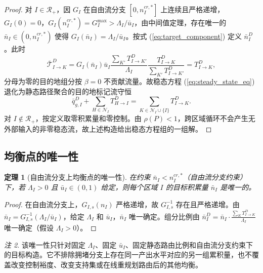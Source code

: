 \documentclass[a4paper,12pt]{article}
\theoremstyle{plain}
\newtheorem{theorem}{定理}[section]
\theoremstyle{definition}
\theoremstyle{remark}
\newtheorem{remark}[theorem]{注}
\begin{document}
\begin{proof}
对 $I\in\mathcal R_+$，因 $G_I$ 在自由流分支 $[0, n_I^{cr,*}]$ 上连续且严格递增，$G_I(0)=0$，$G_I(n_I^{cr,*})=G_I^{\max}>\Lambda_I/\bar u_I$，由中间值定理，存在唯一的 $\bar n_I\in(0,n_I^{cr,*})$ 使得 $G_I(\bar n_I)=\Lambda_I/\bar u_I$。按式 (\ref{eq:target_component}) 定义 $\bar n_I^D$。此时
\begin{equation}
    \bar{\mathcal T}_{I\to K}^D
    =
    G_I(\bar n_I)\bar u_I
    \frac{\sum_{K'}T_{I\to K'}^D}{\Lambda_I}
    \frac{T_{I\to K}^D}{\sum_{K'}T_{I\to K'}^D}
    =
    T_{I\to K}^D ,
\end{equation}
分母为零的目的地组分按 $\beta=0$ 不贡献流量。故稳态方程 (\ref{eq:steady_state_eq}) 退化为静态路径聚合的目的地标记流守恒
\begin{equation}
    \bar q_{g,I}^D+\sum_{H\in\mathcal N_I}T_{H\to I}^D
    =
    \sum_{K\in\mathcal N_I\cup\{I\}}T_{I\to K}^D .
\end{equation}
对 $I\notin\mathcal R_+$，按定义取零积累量和零控制。由 $\rho(P)<1$，跨区域循环不会产生无外部输入的非零稳态流，故上述构造给出稳态方程组的一组解。
\end{proof}

\subsection{均衡点的唯一性}

\begin{theorem}[自由流分支上均衡点的唯一性]\label{thm:equilibrium_uniqueness}
在约束 $\bar{n}_I < n_I^{cr,*}$（自由流分支约束）下，若 $\Lambda_I > 0$ 且 $\bar u_I\in(0,1)$ 给定，则每个区域 $I$ 的目标积累量 $\bar{n}_I$ 是唯一的。
\end{theorem}

\begin{proof}
在自由流分支上，$G_{I,s}(n_I)$ 严格递增，故 $G_{I,s}^{-1}$ 存在且严格递增。由 $\bar{n}_I = G_{I,s}^{-1}(\Lambda_I/\bar u_I)$，给定 $\Lambda_I$ 和 $\bar u_I$，$\bar{n}_I$ 唯一确定。组分比例由 $\bar{n}_I^D = \bar{n}_I \cdot \frac{\sum_K T_{I \to K}^D}{\Lambda_I}$ 唯一确定（假设 $\Lambda_I > 0$）。
\end{proof}

\begin{remark}
该唯一性只针对固定 $\Lambda_I$、固定 $\bar u_I$、固定静态路由比例和自由流分支约束下的目标构造。它不排除拥堵分支上存在同一产出水平对应的另一组累积量，也不覆盖改变控制裕度、改变支持集或在线重规划路由后的其他均衡。
\end{remark}
\end{document}
